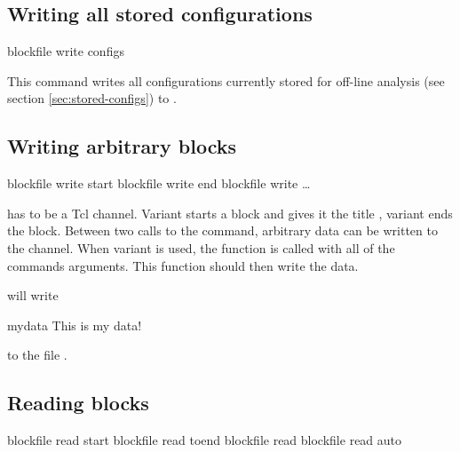 \subsection{Writing all stored configurations}
\label{sec:blockfile:configs}
\begin{essyntax}
  blockfile  write configs
\end{essyntax}

This command writes all configurations currently stored for off-line
analysis (see section \vref{sec:stored-configs}) to .

\subsection{Writing arbitrary blocks}

\begin{essyntax}
   blockfile  write start 
   blockfile  write end
   blockfile  write  \dots
\end{essyntax}

 has to be a Tcl channel. Variant  starts a
block and gives it the title , variant  ends the
block. Between two calls to the command, arbitrary data can be written
to the channel.  When variant  is used, the function
 is called with all of the commands
arguments. This function should then write the data.


will write 
\begin{tclcode}
{mydata {This is my data!}}
\end{tclcode}
to the file .


\subsection{Reading blocks}

\begin{essyntax}
   blockfile  read start 
   blockfile  read toend 
   blockfile  read 
   blockfile  read auto 
\end{essyntax}

